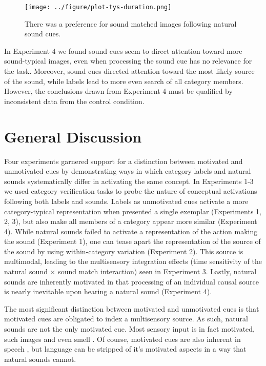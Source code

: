 \documentclass[12pt, titlepage]{article}
\begin{document}
\begin{figure}[h!]
	\centering
	\caption{There was a preference for sound matched images following natural sound cues.}
	\label{fig:tys-dur}
	\texttt{[image: ../figure/plot-tys-duration.png]}
\end{figure}

In Experiment 4 we found sound cues seem to direct attention toward more sound-typical images, even when processing the sound cue has no relevance for the task. Moreover, sound cues directed attention toward the most likely source of the sound, while labels lead to more even search of all category members. However, the conclusions drawn from Experiment 4 must be qualified by inconsistent data from the control condition. 

\section*{General Discussion}
Four experiments garnered support for a distinction between motivated and unmotivated cues by demonstrating ways in which category labels and natural sounds systematically differ in activating the same concept. In Experiments 1-3 we used category verification tasks to probe the nature of conceptual activations following both labels and sounds. Labels as unmotivated cues activate a more category-typical representation when presented a single exemplar (Experiments 1, 2, 3), but also make all members of a category appear more similar (Experiment 4). While natural sounds failed to activate a representation of the action making the sound (Experiment 1), one can tease apart the representation of the source of the sound by using within-category variation (Experiment 2). This source is multimodal, leading to the multisensory integration effects (time sensitivity of the natural sound $\times$ sound match interaction) seen in Experiment 3. Lastly, natural sounds are inherently motivated in that processing of an individual causal source is nearly inevitable upon hearing a natural sound (Experiment 4).

The most significant distinction between motivated and unmotivated cues is that motivated cues are obligated to index a multisensory source. As such, natural sounds are not the only motivated cue. Most sensory input is in fact motivated, such images \cite{Beauchamp:2004ts,Brunel:2010hta} and even smell \cite{Gottfried:2003wj}. Of course, motivated cues are also inherent in speech \cite{vonKriegstein:2006cc,Shintel:2007co,Rendall:2007cj}, but language can be stripped of it's motivated aspects in a way that natural sounds cannot.
\end{document}
